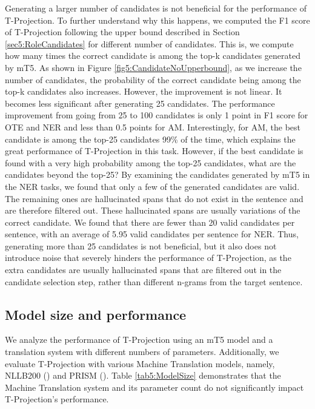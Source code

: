 Generating a larger number of candidates is not beneficial for the performance of T-Projection. To further understand why this happens, we computed the F1 score of T-Projection following the upper bound described in Section \ref{sec5:RoleCandidates} for different number of candidates. This is, we compute how many times the correct candidate is among the top-k candidates generated by mT5. As shown in Figure \ref{fig5:CandidateNoUpperbound}, as we increase the number of candidates, the probability of the correct candidate being among the top-k candidates also increases. However, the improvement is not linear. It becomes less significant after generating 25 candidates. The performance improvement from going from 25 to 100 candidates is only 1 point in F1 score for OTE and NER and less than 0.5 points for AM. Interestingly, for AM, the best candidate is among the top-25 candidates 99\% of the time, which explains the great performance of T-Projection in this task. However, if the best candidate is found with a very high probability among the top-25 candidates, what are the candidates beyond the top-25? By examining the candidates generated by mT5 in the NER tasks, we found that only a few of the generated candidates are valid. The remaining ones are hallucinated spans that do not exist in the sentence and are therefore filtered out. These hallucinated spans are usually variations of the correct candidate. We found that there are fewer than 20 valid candidates per sentence, with an average of 5.95 valid candidates per sentence for NER. Thus, generating more than 25 candidates is not beneficial, but it also does not introduce noise that severely hinders the performance of T-Projection, as the extra candidates are usually hallucinated spans that are filtered out in the candidate selection step, rather than different n-grams from the target sentence.


\subsection{Model size and performance}

 

We analyze the performance of T-Projection using an mT5 model and a translation system with different numbers of parameters. Additionally, we evaluate T-Projection with various Machine Translation models, namely, NLLB200 (\cite{DBLP:journals/corr/abs-2207-04672}) and PRISM (\cite{DBLP:conf/emnlp/ThompsonP20}). Table \ref{tab5:ModelSize} demonstrates that the Machine Translation system and its parameter count do not significantly impact T-Projection's performance.

